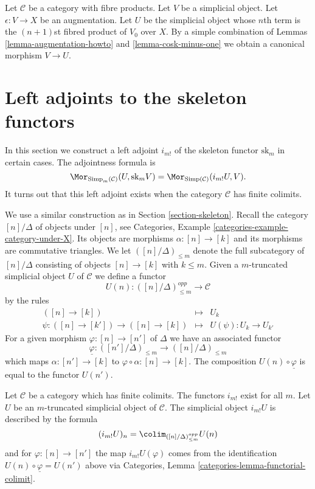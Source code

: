 \begin{remark}
\label{remark-augmentation}
Let $\mathcal{C}$ be a category with fibre products.
Let $V$ be a simplicial object.
Let $\epsilon : V \to X$ be an augmentation.
Let $U$ be the simplicial object whose $n$th term
is the $(n + 1)$st fibred product of $V_0$ over $X$.
By a simple combination of
Lemmas \ref{lemma-augmentation-howto} and \ref{lemma-cosk-minus-one}
we  obtain a canonical morphism
$V \to U$.
\end{remark}





\section{Left adjoints to the skeleton functors}
\label{section-adjoint-left}

\noindent
In this section we construct a left adjoint $i_{m!}$
of the skeleton functor $\text{sk}_m$ in certain cases.
The adjointness formula is
$$
\Mor_{\text{Simp}_m(\mathcal{C})}(U, \text{sk}_mV)
=
\Mor_{\text{Simp}(\mathcal{C})}(i_{m!}U, V).
$$
It turns out that this left adjoint exists when
the category $\mathcal{C}$ has finite colimits.

\medskip\noindent
We use a similar construction as in Section \ref{section-skeleton}.
Recall the category $[n]/\Delta$ of objects
under $[n]$, see
Categories, Example \ref{categories-example-category-under-X}.
Its objects are morphisms $\alpha : [n] \to [k]$
and its morphisms are commutative triangles.
We let $([n]/\Delta)_{\leq m}$ denote the full subcategory
of $[n]/\Delta$ consisting of objects $[n] \to [k]$
with $k \leq m$. Given a $m$-truncated
simplicial object $U$ of $\mathcal{C}$
we define a functor
$$
U(n) : ([n]/\Delta)_{\leq m}^{opp} \longrightarrow \mathcal{C}
$$
by the rules
\begin{eqnarray*}
([n] \to [k]) & \longmapsto & U_k \\
\psi : ([n] \to [k']) \to ([n] \to [k])
& \longmapsto &
U(\psi) : U_k \to U_{k'}
\end{eqnarray*}
For a given morphism $\varphi : [n] \to [n']$ of $\Delta$
we have an associated functor
$$
\underline{\varphi} :
([n']/\Delta)_{\leq m}
\longrightarrow
([n]/\Delta)_{\leq m}
$$
which maps $\alpha : [n'] \to [k]$ to
$\varphi \circ \alpha : [n] \to [k]$.
The composition $U(n) \circ \underline{\varphi}$ is
equal to the functor $U(n')$.

\begin{lemma}
\label{lemma-left-adjoint-exists}
Let $\mathcal{C}$ be a category which has finite colimits.
The functors $i_{m!}$ exist for all $m$.
Let $U$ be an $m$-truncated simplicial object of $\mathcal{C}$.
The simplicial object $i_{m!}U$
is described by the formula
$$
(i_{m!}U)_n = \colim_{([n]/\Delta)_{\leq m}^{opp}} U(n)
$$
and for $\varphi : [n] \to [n']$ the map
$i_{m!}U(\varphi)$ comes from the
identification $U(n) \circ \underline{\varphi} = U(n')$ above
via Categories, Lemma \ref{categories-lemma-functorial-colimit}.
\end{lemma}

